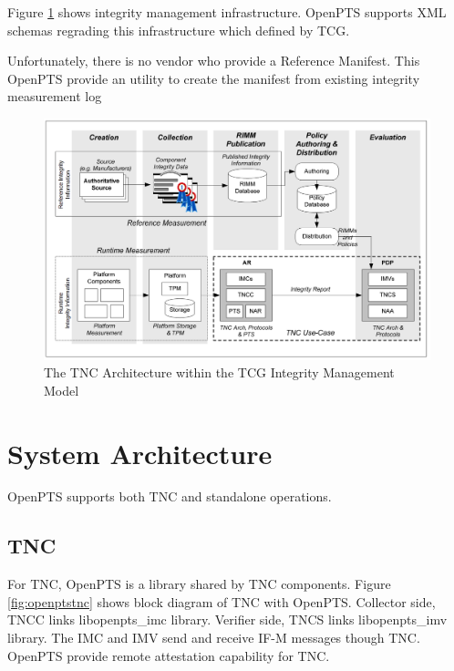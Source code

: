\documentclass[12pt,a4paper]{article}
\begin{document}
Figure \ref{fig:tncwimm} shows integrity management infrastructure.
OpenPTS supports XML schemas regrading this infrastructure which defined by TCG.

Unfortunately, there is no vendor who provide a Reference Manifest.
This OpenPTS provide an utility to create the manifest from existing integrity measurement log 


\begin{figure}[b!p]
  \begin{center}
    \includegraphics[width=15cm]{TNC_Architecture_3.png}
  \end{center}
  \caption{The TNC Architecture within the TCG Integrity Management Model\cite{tncarch}}
  \label{fig:tncwimm}
\end{figure}




\clearpage 

\section{System Architecture}

OpenPTS supports both TNC and standalone operations.

\subsection{TNC}

For TNC, OpenPTS is a library shared by TNC components.
Figure \ref{fig:openptstnc} shows block diagram of TNC with OpenPTS. 
Collector side, TNCC links libopenpts\_imc library. 
Verifier side, TNCS links libopenpts\_imv library. 
The IMC and IMV send and receive IF-M messages though TNC.
OpenPTS provide remote attestation capability for TNC.
\end{document}
